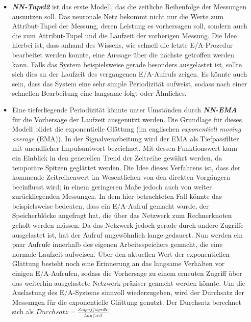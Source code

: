 \documentclass[
	12pt,
	a4paper,
	BCOR10mm,
	DIV14,
	listof=totoc,
	bibliography=totoc,
	headsepline
]{scrreprt}
\begin{document}
\begin{itemize}
	\item \textit{\textbf{NN-Tupel2}} ist das erste Modell, das die zeitliche Reihenfolge der Messungen ausnutzen soll. Das neuronale Netz bekommt nicht nur die Werte zum Attribut-Tupel der Messung, deren Leistung es vorhersagen soll, sondern auch die zum Attribut-Tupel und die Laufzeit der vorherigen Messung.
	Die Idee hierbei ist, dass anhand des Wissens, wie schnell die letzte E/A-Prozedur bearbeitet werden konnte, eine Aussage über die nächste getroffen werden kann. Falls das System beispielsweise gerade besonders ausgelastet ist, sollte sich dies an der Laufzeit des vergangenen E/A-Aufrufs zeigen.
	Es könnte auch sein, dass das System eine sehr simple Periodizität aufweist, sodass nach einer schnellen Bearbeitung eine langsame folgt oder Ähnliches.
	\item Eine tieferliegende Periodizität könnte unter Umständen durch \textit{\textbf{NN-EMA}} für die Vorhersage der Laufzeit ausgenutzt werden. Die Grundlage für dieses Modell bildet die exponentielle Glättung (im englischen \textit{exponentiell moving average} (EMA)). In der Signalverarbeitung wird der EMA als Tiefpassfilter mit unendlicher Impulsantwort bezeichnet.
	Mit dessen Funktionswert kann ein Einblick in den generellen Trend der Zeitreihe gewährt werden, da temporäre Spitzen geglättet werden.
	Die Idee dieses Verfahrens ist, dass der kommende Zeitreihenwert im Wesentlichen von den direkten Vorgängern beeinflusst wird; in einem geringeren Maße jedoch auch von weiter zurückliegenden Messungen.
	In dem hier betrachteten Fall könnte das beispielsweise bedeuten, dass ein E/A-Aufruf gemacht wurde, der Speicherblöcke angefragt hat, die über das Netzwerk zum Rechnerknoten geholt werden müssen. Da das Netzwerk jedoch gerade durch andere Zugriffe ausgelastet ist, hat der Aufruf ungewöhnlich lange gedauert. Nun werden ein paar Aufrufe innerhalb des eigenen Arbeitsspeichers gemacht, die eine normale Laufzeit aufweisen. Über den aktuellen Wert der exponentiellen Glättung besteht noch eine Erinnerung an das langsame Verhalten vor einigen E/A-Aufrufen, sodass die Vorhersage zu einem erneuten Zugriff über das weiterhin ausgelastete Netzwerk präziser gemacht werden könnte.
	Um die Auslastung des E/A-Systems sinnvoll wiederzugeben, wird der Durchsatz der Messungen für die exponentielle Glättung genutzt. Der Durchsatz berechnet sich als $Durchsatz =  \frac{Zugriffsgrö\text{ß}e}{Laufzeit}$.
	

\end{itemize}
\end{document}
